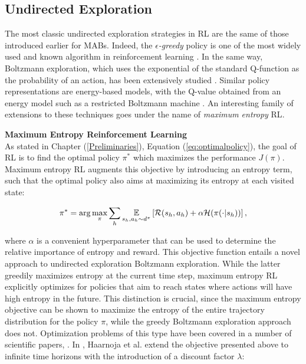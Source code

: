 \subsection{Undirected Exploration}
The most classic undirected exploration strategies in \gls{RL} are the same of those introduced earlier for \gls{MAB}s. Indeed, the $\epsilon$\emph{-greedy} policy is one of the most widely used and known algorithm in reinforcement learning \cite{sutton2018reinforcement}. In the same way, Boltzmann exploration, which uses the exponential of the
standard Q-function as the probability of an action, has been extensively studied \cite{thrun1992efficient, cesa2017boltzmann}. Similar policy representations are energy-based models, with
the Q-value obtained from an energy model such as a restricted Boltzmann machine \cite{sallans2004reinforcement}. An interesting family of extensions to these techniques goes under the name of \emph{maximum entropy} \gls{RL}.

\textbf{Maximum Entropy Reinforcement Learning} \\
As stated in Chapter (\ref{Preliminaries}), Equation (\ref{eq:optimalpolicy}), the goal of \gls{RL} is to find the optimal policy $\pi^*$ which maximizes the performance $J(\pi)$. Maximum entropy \gls{RL} augments this objective by introducing an entropy term, such that the optimal policy also aims at maximizing its entropy at each visited state:

\begin{align}
\pi^*=\arg\max_\pi\sum_h\underset{s_h,a_h\sim d^{\pi}}{\mathbb{E}}\left[{\mathcal{R}(s_h,a_h)+\alpha\mathcal{H}(\pi(\cdot|s_h))}\right],
\end{align}

where $\alpha$ is a convenient hyperparameter that can be used to determine the relative importance of entropy and reward. This objective function entails a novel approach to undirected exploration \wrt Boltzmann  exploration. While the latter greedily maximizes entropy at the current time step, maximum entropy \gls{RL} explicitly optimizes for policies that aim to reach states where actions will have high entropy in the future. This distinction is crucial, since the maximum entropy objective can be shown to maximize the entropy of the entire trajectory distribution for the policy $\pi$, while the greedy Boltzmann exploration approach does not. Optimization problems of this type have been covered in a number of scientific papers, \eg \cite{ziebart2008maximum, haarnoja2017reinforcement, haarnoja2018soft}. In \cite{haarnoja2017reinforcement}, Haarnoja et al. extend the objective presented above to infinite time horizons with the introduction of a discount factor $\lambda$:


